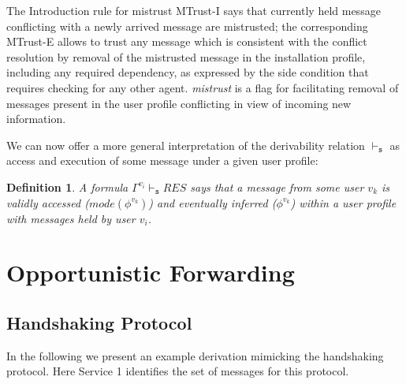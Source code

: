 \documentclass[compsoc, conference, letterpaper, 10pt, times]{IEEEtran}
\newtheorem{definition}{Definition}
\begin{document}
The Introduction rule for mistrust MTrust-I says that currently held message conflicting with a newly arrived message are mistrusted; the corresponding MTrust-E allows to trust any message which is consistent with the conflict resolution by removal of the mistrusted message in the installation profile, including any required dependency, as expressed by the side condition that requires checking for any other agent. 
\textit{mistrust} is a flag for facilitating removal of messages present in the user profile conflicting in view of incoming new information. 



We can now offer a more general interpretation of the derivability relation $\vdash_{\mathtt{s}} $ as access and execution of some message under a given user profile:
%
\begin{definition}
	A formula $\Gamma^{v_{i}} \vdash_{\mathtt{s}}  RES$ says that a message from some user $v_{k}$ is validly accessed ($mode(\phi^{v_{k}})$) and eventually inferred ($\phi^{v_{k}}$) within a user profile with messages held by user $v_{i}$. 
\end{definition}



\section{Opportunistic Forwarding}

\subsection{Handshaking Protocol}

In the following we present an example derivation mimicking the handshaking protocol. Here Service 1 identifies the set of messages for this protocol.
\end{document}
